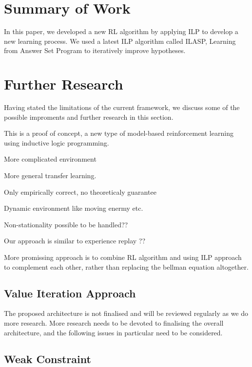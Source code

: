 \section{Summary of Work}
\label{sec:summary_of_work}

In this paper, we developed a new RL algorithm by applying ILP to develop a new learning process.
We used a latest ILP algorithm called ILASP, Learning from Answer Set Program to iteratively improve hypotheses.

\section{Further Research}
\label{sec:further_research}

Having stated the limitations of the current framework, we discuss some of the possible improments and further research in this section.

This is a proof of concept, a new type of model-based reinforcement learning using inductive logic programming. 

More complicated environment

More general transfer learning.

Only empirically correct, no theoreticaly guarantee

Dynamic environment like moving enermy etc.

Non-stationality possible to be handled??

Our approach is similar to experience replay ??

More promissing approach is to combine RL algorithm and using ILP approach to complement each other, rather than replacing the bellman equation altogether. 

\subsection{Value Iteration Approach}

The proposed architecture is not finalised and will be reviewed regularly as we do more research.
More research needs to be devoted to finalising the overall architecture, and the following issues in particular need to be considered.

\subsection{Weak Constraint}

